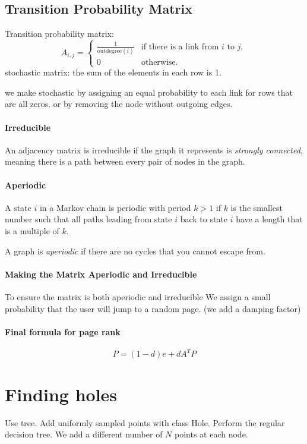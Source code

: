 \documentclass[10pt,oneside,a4paper]{article}
\begin{document}
\subsection{Transition Probability Matrix}
Transition probability matrix:
\[
    A_{i,j} =
    \begin{cases}
        \frac{1}{\text{outdegree}(i)} & \text{if there is a link from } i \text{ to } j, \\
        0                             & \text{otherwise.}
    \end{cases}
\]
stochastic matrix: the sum of the elements in each row is 1.

we make stochastic by assigning an equal probability to each link for rows that are all zeros. or by removing the node without outgoing edges.

\paragraph{Irreducible}
An adjacency matrix is irreducible if the graph it represents is \emph{strongly connected}, meaning there is a path between every pair of nodes in the graph.

\paragraph{Aperiodic}
A state \( i \) in a Markov chain is periodic with period \( k > 1 \) if \( k \) is the smallest number such that all paths leading from state \( i \) back to state \( i \) have a length that is a multiple of \( k \).

A graph is \emph{aperiodic} if there are no cycles that you cannot escape from.

\paragraph{Making the Matrix Aperiodic and Irreducible}
To ensure the matrix is both aperiodic and irreducible We assign a small probability that the user will jump to a random page. (we add a damping factor)

\paragraph{Final formula for page rank}
\[
    P = (1 - d)e + dA^T P
\]

\section{Finding holes}
Use tree. Add uniformly sampled points with class Hole. Perform the regular decision tree.
We add a different number of \( N \) points at each node.
\end{document}
